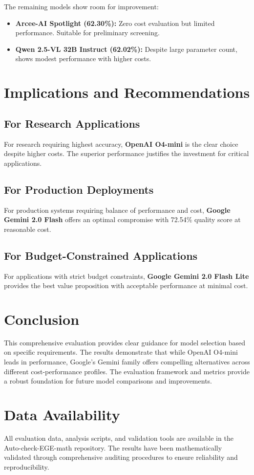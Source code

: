 \documentclass[11pt]{article}
\begin{document}
The remaining models show room for improvement:

\begin{itemize}
\item \textbf{Arcee-AI Spotlight (62.30\%):} Zero cost evaluation but limited performance. Suitable for preliminary screening.

\item \textbf{Qwen 2.5-VL 32B Instruct (62.02\%):} Despite large parameter count, shows modest performance with higher costs.
\end{itemize}

\section{Implications and Recommendations}

\subsection{For Research Applications}

For research requiring highest accuracy, \textbf{OpenAI O4-mini} is the clear choice despite higher costs. The superior performance justifies the investment for critical applications.

\subsection{For Production Deployments}

For production systems requiring balance of performance and cost, \textbf{Google Gemini 2.0 Flash} offers an optimal compromise with 72.54\% quality score at reasonable cost.

\subsection{For Budget-Constrained Applications}

For applications with strict budget constraints, \textbf{Google Gemini 2.0 Flash Lite} provides the best value proposition with acceptable performance at minimal cost.

\section{Conclusion}

This comprehensive evaluation provides clear guidance for model selection based on specific requirements. The results demonstrate that while OpenAI O4-mini leads in performance, Google's Gemini family offers compelling alternatives across different cost-performance profiles. The evaluation framework and metrics provide a robust foundation for future model comparisons and improvements.

\section{Data Availability}

All evaluation data, analysis scripts, and validation tools are available in the Auto-check-EGE-math repository. The results have been mathematically validated through comprehensive auditing procedures to ensure reliability and reproducibility.
\end{document}
